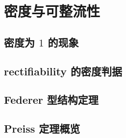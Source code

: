 \section{密度与可整流性}
\label{b1:sec:1904}


\subsection{密度为 \texorpdfstring{\(1\)}{1} 的现象}
\label{b1:subsec:190401}

\subsection{rectifiability 的密度判据}
\label{b1:subsec:190402}

\subsection{Federer 型结构定理}
\label{b1:subsec:190403}

\subsection{Preiss 定理概览}
\label{b1:subsec:190404}


